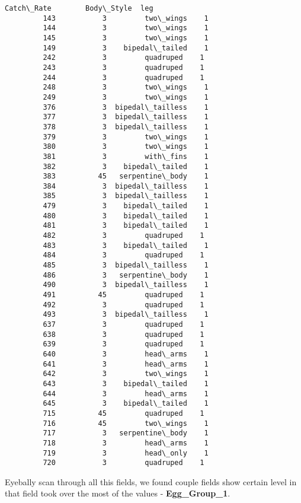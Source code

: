 \documentclass[11pt]{article}
\begin{document}
\begin{Verbatim}[commandchars=\\\{\}]
              Catch\_Rate        Body\_Style  leg  
         143           3         two\_wings    1  
         144           3         two\_wings    1  
         145           3         two\_wings    1  
         149           3    bipedal\_tailed    1  
         242           3         quadruped    1  
         243           3         quadruped    1  
         244           3         quadruped    1  
         248           3         two\_wings    1  
         249           3         two\_wings    1  
         376           3  bipedal\_tailless    1  
         377           3  bipedal\_tailless    1  
         378           3  bipedal\_tailless    1  
         379           3         two\_wings    1  
         380           3         two\_wings    1  
         381           3         with\_fins    1  
         382           3    bipedal\_tailed    1  
         383          45   serpentine\_body    1  
         384           3  bipedal\_tailless    1  
         385           3  bipedal\_tailless    1  
         479           3    bipedal\_tailed    1  
         480           3    bipedal\_tailed    1  
         481           3    bipedal\_tailed    1  
         482           3         quadruped    1  
         483           3    bipedal\_tailed    1  
         484           3         quadruped    1  
         485           3  bipedal\_tailless    1  
         486           3   serpentine\_body    1  
         490           3  bipedal\_tailless    1  
         491          45         quadruped    1  
         492           3         quadruped    1  
         493           3  bipedal\_tailless    1  
         637           3         quadruped    1  
         638           3         quadruped    1  
         639           3         quadruped    1  
         640           3         head\_arms    1  
         641           3         head\_arms    1  
         642           3         two\_wings    1  
         643           3    bipedal\_tailed    1  
         644           3         head\_arms    1  
         645           3    bipedal\_tailed    1  
         715          45         quadruped    1  
         716          45         two\_wings    1  
         717           3   serpentine\_body    1  
         718           3         head\_arms    1  
         719           3         head\_only    1  
         720           3         quadruped    1  
\end{Verbatim}
            
    Eyebally scan through all this fields, we found couple fields show
certain level in that field took over the most of the values -
\textbf{Egg\_Group\_1}.
\end{document}
